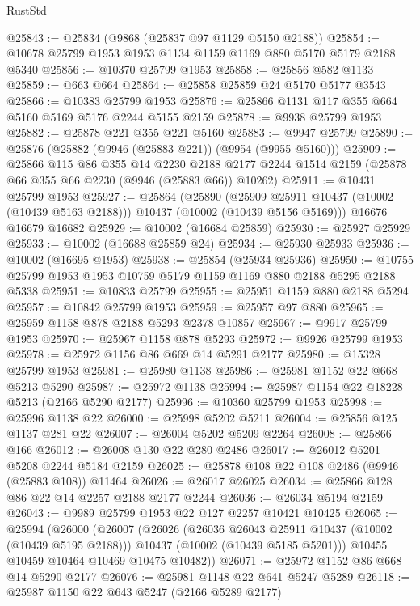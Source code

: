 \begin{lexlean}{RustStd}
\begin{coremodule}
@25843 := @25834 (@9868 (@25837 @97 @1129 @5150 @2188))
@25854 := @10678 @25799 @1953 @1953 @1134 @1159 @1169 @880 @5170 @5179 @2188 @5340
@25856 := @10370 @25799 @1953
@25858 := @25856 @582 @1133
@25859 := @663 @664
@25864 := @25858 @25859 @24 @5170 @5177 @3543
@25866 := @10383 @25799 @1953
@25876 := @25866 @1131 @117 @355 @664 @5160 @5169 @5176 @2244 @5155 @2159
@25878 := @9938 @25799 @1953
@25882 := @25878 @221 @355 @221 @5160
@25883 := @9947 @25799
@25890 := @25876 (@25882 (@9946 (@25883 @221)) (@9954 (@9955 @5160)))
@25909 := @25866
    @115
    @86
    @355
    @14
    @2230
    @2188
    @2177
    @2244
    @1514
    @2159
    (@25878 @66 @355 @66 @2230 (@9946 (@25883 @66)) @10262)
@25911 := @10431 @25799 @1953
@25927 := @25864
    (@25890
      (@25909 @25911 @10437 (@10002 (@10439 @5163 @2188)))
      @10437
      (@10002 (@10439 @5156 @5169)))
    @16676
    @16679
    @16682
@25929 := @10002 (@16684 @25859)
@25930 := @25927 @25929
@25933 := @10002 (@16688 @25859 @24)
@25934 := @25930 @25933
@25936 := @10002 (@16695 @1953)
@25938 := @25854 (@25934 @25936)
@25950 := @10755 @25799 @1953 @1953 @10759 @5179 @1159 @1169 @880 @2188 @5295 @2188 @5338
@25951 := @10833 @25799
@25955 := @25951 @1159 @880 @2188 @5294
@25957 := @10842 @25799 @1953
@25959 := @25957 @97 @880
@25965 := @25959 @1158 @878 @2188 @5293 @2378 @10857
@25967 := @9917 @25799 @1953
@25970 := @25967 @1158 @878 @5293
@25972 := @9926 @25799 @1953
@25978 := @25972 @1156 @86 @669 @14 @5291 @2177
@25980 := @15328 @25799 @1953
@25981 := @25980 @1138
@25986 := @25981 @1152 @22 @668 @5213 @5290
@25987 := @25972 @1138
@25994 := @25987 @1154 @22 @18228 @5213 (@2166 @5290 @2177)
@25996 := @10360 @25799 @1953
@25998 := @25996 @1138 @22
@26000 := @25998 @5202 @5211
@26004 := @25856 @125 @1137 @281 @22
@26007 := @26004 @5202 @5209 @2264
@26008 := @25866 @166
@26012 := @26008 @130 @22 @280 @2486
@26017 := @26012 @5201 @5208 @2244 @5184 @2159
@26025 := @25878 @108 @22 @108 @2486 (@9946 (@25883 @108)) @11464
@26026 := @26017 @26025
@26034 := @25866 @128 @86 @22 @14 @2257 @2188 @2177 @2244
@26036 := @26034 @5194 @2159
@26043 := @9989 @25799 @1953 @22 @127 @2257 @10421 @10425
@26065 := @25994
    (@26000
      (@26007
        (@26026
          (@26036 @26043 @25911 @10437 (@10002 (@10439 @5195 @2188)))
          @10437
          (@10002 (@10439 @5185 @5201)))
        @10455
        @10459
        @10464
        @10469
        @10475
        @10482))
@26071 := @25972 @1152 @86 @668 @14 @5290 @2177
@26076 := @25981 @1148 @22 @641 @5247 @5289
@26118 := @25987
    @1150
    @22
    @643
    @5247
    (@2166 @5289 @2177)

\end{coremodule}
\end{lexlean}
